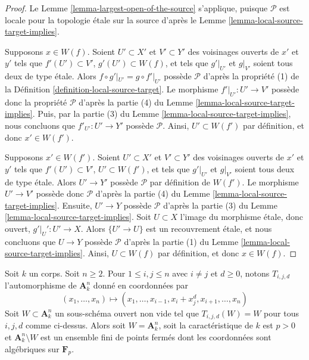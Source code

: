 \begin{proof}
Le Lemme \ref{lemma-largest-open-of-the-source} s'applique, puisque
$\mathcal{P}$ est locale pour la topologie \'etale sur la source d'après le
Lemme \ref{lemma-local-source-target-implies}.

\medskip\noindent
Supposons $x \in W(f)$. Soient $U' \subset X'$ et $V' \subset Y'$ des
voisinages ouverts de $x'$ et $y'$ tels que $f'(U') \subset V'$,
$g'(U') \subset W(f)$, et tels que $g'|_{U'}$ et $g|_{V'}$ soient tous deux de
type \'etale.
Alors $f \circ g'|_{U'} = g \circ f'|_{U'}$ possède $\mathcal{P}$ d'après la
propriété (1) de la Définition \ref{definition-local-source-target}.
Le morphisme $f'|_{U'} : U' \to V'$ possède donc la propriété $\mathcal{P}$
d'après la partie (4) du Lemme \ref{lemma-local-source-target-implies}.
Puis, par la partie (3) du Lemme \ref{lemma-local-source-target-implies}, nous
concluons que $f'_{U'} : U' \to Y'$ possède $\mathcal{P}$.
Ainsi, $U' \subset W(f')$ par définition, et donc $x' \in W(f')$.

\medskip\noindent
Supposons $x' \in W(f')$. Soient $U' \subset X'$ et $V' \subset Y'$ des
voisinages ouverts de $x'$ et $y'$ tels que $f'(U') \subset V'$,
$U' \subset W(f')$, et tels que $g'|_{U'}$ et $g|_{V'}$ soient tous deux de
type \'etale.
Alors $U' \to Y'$ possède $\mathcal{P}$ par définition de $W(f')$.
Le morphisme $U' \to V'$ possède donc $\mathcal{P}$ d'après la partie (4) du
Lemme \ref{lemma-local-source-target-implies}.
Ensuite, $U' \to Y$ possède $\mathcal{P}$ d'après la partie (3) du
Lemme \ref{lemma-local-source-target-implies}.
Soit $U \subset X$ l'image du morphisme \'etale, donc ouvert,
$g'|_U' : U' \to X$. Alors $\{U' \to U\}$ est un recouvrement \'etale, et
nous concluons que $U \to Y$ possède $\mathcal{P}$ d'après la partie (1) du
Lemme \ref{lemma-local-source-target-implies}.
Ainsi, $U \subset W(f)$ par définition, et donc $x \in W(f)$.
\end{proof}

\begin{lemma}
\label{lemma-orbits}
Soit $k$ un corps. Soit $n \geq 2$. Pour $1 \leq i, j \leq n$ avec
$i \not = j$ et $d \geq 0$, notons $T_{i, j, d}$ l'automorphisme de
$\mathbf{A}^n_k$ donné en coordonnées par
$$
(x_1, \ldots, x_n) \longmapsto
(x_1, \ldots, x_{i - 1}, x_i + x_j^d, x_{i + 1}, \ldots, x_n)
$$
Soit $W \subset \mathbf{A}^n_k$ un sous-schéma ouvert non vide tel que
$T_{i, j, d}(W) = W$ pour tous $i, j, d$ comme ci-dessus. Alors soit
$W = \mathbf{A}^n_k$, soit la caractéristique de $k$ est $p > 0$ et
$\mathbf{A}^n_k \setminus W$ est un ensemble fini de points fermés dont les
coordonnées sont algébriques sur $\mathbf{F}_p$.
\end{lemma}

